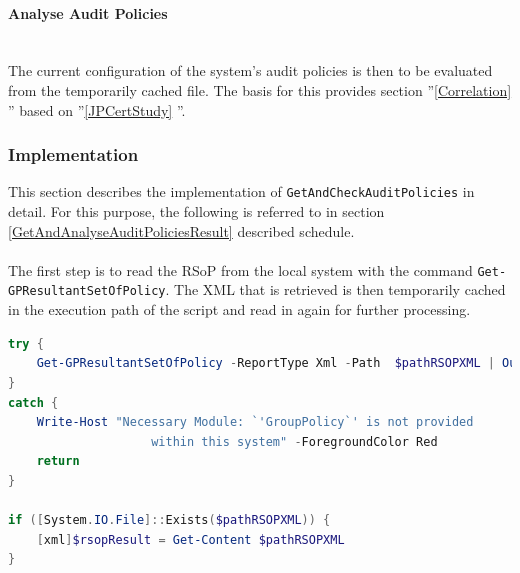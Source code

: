 \paragraph{Analyse Audit Policies} \ \\
The current configuration of the system's audit policies is then to be evaluated from the temporarily cached file. The basis for this provides section ''\ref{Correlation} '' based on ''\ref{JPCertStudy} ''.

\clearpage 

\subsubsection{Implementation}
This section describes the implementation of \lstinline|GetAndCheckAuditPolicies| in detail. For this purpose, the following is referred to in section \ref{GetAndAnalyseAuditPoliciesResult}  described schedule.
\\\\
The first step is to read the RSoP from the local system with the command \lstinline|Get-GPResultantSetOfPolicy|. The XML that is retrieved is then temporarily cached in the execution path of the script and read in again for further processing.
\begin{lstlisting}[caption=Get-GPResultantSetOfPolicy, language=PowerShell]
try {
    Get-GPResultantSetOfPolicy -ReportType Xml -Path  $pathRSOPXML | Out-Null
}
catch {
    Write-Host "Necessary Module: `'GroupPolicy`' is not provided 
                    within this system" -ForegroundColor Red
    return
}

if ([System.IO.File]::Exists($pathRSOPXML)) {
    [xml]$rsopResult = Get-Content $pathRSOPXML
}
\end{lstlisting}
\vspace{1cm}
